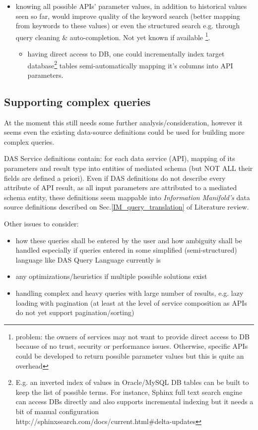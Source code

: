 \begin{itemize}
\begin{itemize}
\item knowing all possible APIs' parameter values, in addition to historical values seen so far, would improve quality of the keyword search (better mapping from keywords to these values) or even the structured search e.g. through query cleaning \& auto-completion. {\color{red}Not yet known if available}%
		\footnote{problem: the owners of services may not want to provide direct access to DB because of no trust, security or performance issues. Otherwise, specific APIs could be developed to return possible parameter values but this is quite an overhead}.
\begin{itemize}
\item having direct access to DB, one could incrementally index target database\footnote{%
			E.g. an inverted index of values in Oracle/MySQL DB tables can be built to keep the list of possible terms. For instance, Sphinx full text search engine can access DBs directly and also supports incremental indexing but it needs a bit of manual configuration {http://sphinxsearch.com/docs/current.html\#delta-updates} }
	tables semi-automatically mapping it's columns into API parameters.

\end{itemize}
	\end{itemize}
\end{itemize}


\subsection{Supporting complex queries}
{\color{red}At the moment this still needs some further analysis/consideration, however it seems even the existing data-source definitions could be used for building more complex queries.}

DAS Service definitions contain: for each data service (API), mapping of its parameters and result type into entities of mediated schema (but NOT ALL their fields are defined a priori). Even if DAS definitions do not describe every attribute of API result, as all input parameters are attributed to a mediated schema entity, these definitions seem mappable  into \textit{Information Manifold's} data source definitions described on Sec.\ref{IM_query_translation} of Literature review.

Other issues to consider:
\begin{itemize}
\item how these queries shall be entered by the user and how ambiguity shall be handled especially if queries entered in some simplified (semi-structured) language like DAS Query Language currently is
\item any optimizations/heuristics if multiple possible solutions exist
\item handling complex and heavy queries with large number of results, e.g. lazy loading with pagination (at least at the level of service composition as APIs do not yet support pagination/sorting)
\end{itemize}

